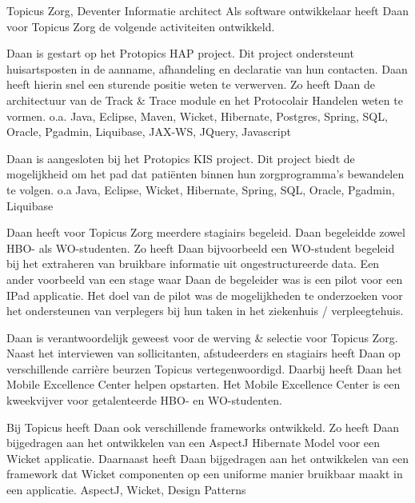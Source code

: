 	\begin{workExperience}{Topicus Zorg, Deventer}%
	{Informatie architect}{}
		Als software ontwikkelaar heeft Daan voor Topicus Zorg de volgende
		activiteiten ontwikkeld.
		
		Daan is gestart op het Protopics HAP project. Dit project ondersteunt
		huisartsposten in de aanname, afhandeling en declaratie van hun
		contacten. Daan heeft hierin snel een sturende positie weten te
		verwerven. Zo heeft Daan de architectuur van de Track \& Trace module en
		het Protocolair Handelen weten te vormen.
		\technics o.a. Java, Eclipse, Maven, Wicket, Hibernate, Postgres,
		Spring, SQL, Oracle, Pgadmin, Liquibase, JAX-WS, JQuery, Javascript
		
		Daan is aangesloten bij het Protopics KIS project. Dit project biedt
		de mogelijkheid om het pad dat pati\"enten binnen hun zorgprogramma's
		bewandelen te volgen.
		\technics o.a Java, Eclipse, Wicket, Hibernate, Spring, SQL, Oracle,
		Pgadmin, Liquibase
		
		Daan heeft voor Topicus Zorg meerdere stagiairs begeleid.
		Daan begeleidde zowel HBO- als WO-studenten. Zo heeft Daan bijvoorbeeld
		een WO-student begeleid bij het extraheren van bruikbare informatie uit
		ongestructureerde data. Een ander voorbeeld van een stage waar Daan de
		begeleider was is een pilot voor een IPad applicatie. Het doel van de
		pilot was de mogelijkheden te onderzoeken voor het ondersteunen van
		verplegers bij hun taken in het ziekenhuis / verpleegtehuis.
		
		Daan is verantwoordelijk geweest voor de werving \& selectie voor
		Topicus Zorg. Naast het interviewen van sollicitanten, afstudeerders en
		stagiairs heeft Daan op verschillende carri\`ere beurzen Topicus
		vertegenwoordigd.
		Daarbij heeft Daan het Mobile Excellence Center helpen opstarten. Het
		Mobile Excellence Center is een kweekvijver voor getalenteerde HBO- en
		WO-studenten.
		
		Bij Topicus heeft Daan ook verschillende frameworks ontwikkeld. Zo
		heeft Daan bijgedragen aan het ontwikkelen van een AspectJ Hibernate
		Model voor een Wicket applicatie. Daarnaast heeft Daan bijgedragen aan
		het ontwikkelen van een framework dat Wicket componenten op een uniforme
		manier bruikbaar maakt in een applicatie.
		\technics AspectJ, Wicket, Design Patterns
	\end{workExperience}

